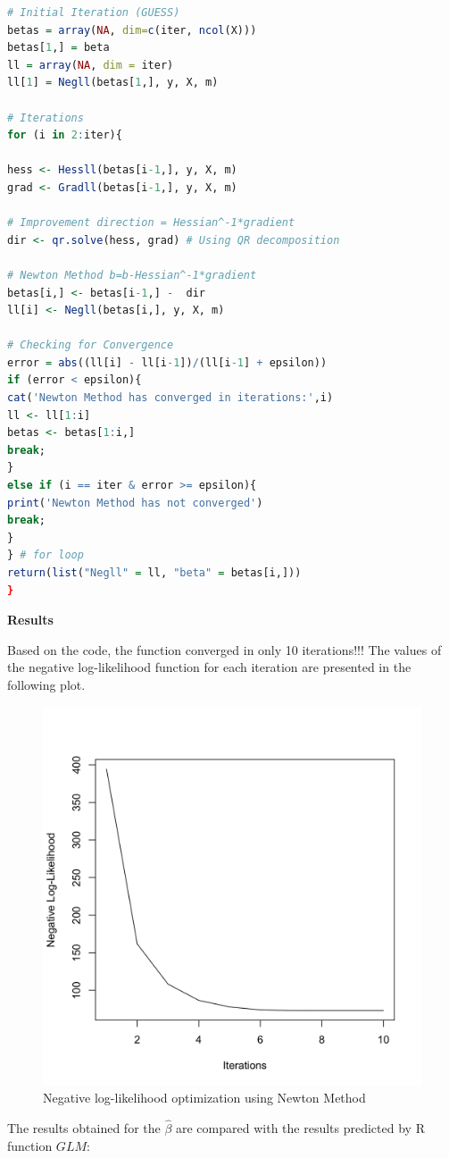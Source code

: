 \documentclass[11 pt]{article}
\begin{document}
\begin{enumerate}[label=(\Alph*)]
\begin{lstlisting}[language=R]
# Initial Iteration (GUESS)
betas = array(NA, dim=c(iter, ncol(X)))
betas[1,] = beta
ll = array(NA, dim = iter)
ll[1] = Negll(betas[1,], y, X, m)

# Iterations
for (i in 2:iter){

hess <- Hessll(betas[i-1,], y, X, m) 
grad <- Gradll(betas[i-1,], y, X, m) 

# Improvement direction = Hessian^-1*gradient
dir <- qr.solve(hess, grad) # Using QR decomposition

# Newton Method b=b-Hessian^-1*gradient
betas[i,] <- betas[i-1,] -  dir
ll[i] <- Negll(betas[i,], y, X, m)

# Checking for Convergence
error = abs((ll[i] - ll[i-1])/(ll[i-1] + epsilon))
if (error < epsilon){
cat('Newton Method has converged in iterations:',i)
ll <- ll[1:i]
betas <- betas[1:i,]
break;
}
else if (i == iter & error >= epsilon){
print('Newton Method has not converged')
break;
}
} # for loop
return(list("Negll" = ll, "beta" = betas[i,])) 
}

\end{lstlisting}

\newpage
\textbf{Results}

Based on the code, the function converged in only 10 iterations!!! The values of the negative log-likelihood function for each iteration are presented in the following plot.


\begin{figure}[H]
	\begin{center}
		\includegraphics[width=.5\linewidth]{Ex01R/Fig/P2B2.png}
		\caption{Negative log-likelihood optimization using Newton Method}
	\end{center}
\end{figure}

The results obtained for the $\hat\beta$ are compared with the results predicted by R function $GLM$:


\end{enumerate}
\end{document}
